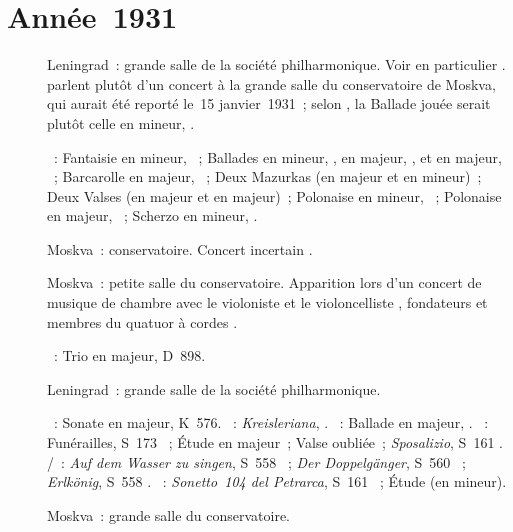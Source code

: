 \section{Année~1931}

\begin{description}
 \item[]
 Leningrad~: grande salle de la société philharmonique.
 Voir en particulier \citet[p.~444]{Milshteyn82a}.
 \citet[p.~402]{Scriabine} parlent plutôt d'un concert à la grande salle du
 conservatoire de Moskva, qui aurait été reporté le~15 janvier~1931~; selon
 \citeauthor{Scriabine}, la Ballade jouée serait plutôt celle en \kF mineur,
 .

 \textsc{\Chopin{}}~: Fantaisie en \kF mineur, ~; Ballades en \kG
 mineur, , en \kF majeur, , et en \kA \Flat majeur,
 ~; Barcarolle en \kF \Sharp majeur, ~; Deux Mazurkas (en
 \kC majeur et en \kA mineur)~; Deux Valses (en \kA \Flat majeur et en \kD
 \Flat majeur)~; Polonaise en \kF \Sharp mineur, ~; Polonaise en
 \kA \Flat majeur, ~; Scherzo en \kB mineur, .
 \item[]
 Moskva~: conservatoire.
 Concert incertain \citep[p.~402]{Scriabine}.
 \item[]
 Moskva~: petite salle du conservatoire.
 Apparition lors d'un concert de musique de chambre avec le violoniste
 \DTziganov{} et le violoncelliste \SShirinsky{}, fondateurs et membres du
 quatuor à cordes \Beethoven{}.

 \textsc{\Schubert{}}~: Trio en \kB \Flat majeur, D~898.
 \item[]
 Leningrad~: grande salle de la société philharmonique.

 \textsc{\Mozart{}}~: Sonate en \kD majeur, K~576.
 \textsc{\Schumann{}}~: \emph{Kreisleriana}, .
 \textsc{\Chopin{}}~: Ballade  en \kA \Flat majeur, .
 \textsc{\Liszt{}}~: Funérailles, S~173 ~; Étude en \kB \Flat
 majeur~; Valse oubliée~; \emph{Sposalizio}, S~161 .
 \textsc{\Schubert{}/\Liszt{}}~: \emph{Auf dem Wasser zu singen}, S~558
 ~; \emph{Der Doppelgänger}, S~560 ~; \emph{Erlkönig},
 S~558 .
 \textsc{\Liszt{}}~: \emph{Sonetto~104 del Petrarca}, S~161 ~;
 Étude (en mineur).
 \item[]
 Moskva~: grande salle du conservatoire.


\end{description}
